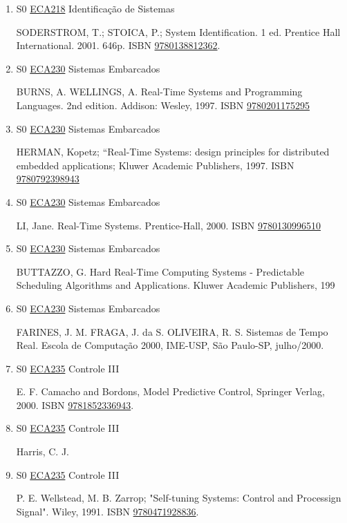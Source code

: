 \documentclass[12pt,a4paper]{book}
\begin{document}
\begin{enumerate}
 ISERMAN, R.;  MUNCHHOF, M.;  Identification of Dynamic Systems - An Introduction With Applications.  1 ed.   London: Springer.  2010.  705p.  ISBN \href{http://www.google.com/search?hl=pt-BR&tbo=p&tbm=bks&q=isbn:9783540788782&num=10}{9783540788782}.  
 
 
 \item S0 \hyperref[PUD:ECA218]{ECA218} Identificação de Sistemas

 SODERSTROM, T.;  STOICA, P.;  System Identification.  1 ed.  Prentice Hall International.  2001.  646p.  ISBN \href{http://www.isbnsearch.org/isbn/9780138812362}{9780138812362}.
 \item S0 \hyperref[PUD:ECA230]{ECA230} Sistemas Embarcados

 BURNS, A.  WELLINGS, A.  Real-Time Systems and Programming Languages.  2nd edition.  Addison: Wesley, 1997.  ISBN \href{http://www.isbnsearch.org/isbn/9780201175295}{9780201175295}
 
 
 \item S0 \hyperref[PUD:ECA230]{ECA230} Sistemas Embarcados

 HERMAN,  Kopetz;  “Real-Time  Systems: design principles for distributed embedded applications;  Kluwer Academic Publishers, 1997.  ISBN \href{http://www.isbnsearch.org/isbn/9780792398943}{9780792398943}
 
 
 \item S0 \hyperref[PUD:ECA230]{ECA230} Sistemas Embarcados

 LI, Jane.  Real-Time Systems.  Prentice-Hall, 2000.  ISBN \href{http://www.isbnsearch.org/isbn/9780130996510}{9780130996510}
 
 
 \item S0 \hyperref[PUD:ECA230]{ECA230} Sistemas Embarcados

 BUTTAZZO, G.  Hard Real-Time Computing Systems - Predictable Scheduling Algorithms and Applications.  Kluwer Academic Publishers, 199
 
 
 \item S0 \hyperref[PUD:ECA230]{ECA230} Sistemas Embarcados

 FARINES, J. M.  FRAGA, J.  da S.  OLIVEIRA, R.  S.  Sistemas de Tempo Real.  Escola de Computação 2000, IME-USP, São Paulo-SP, julho/2000.
 \item S0 \hyperref[PUD:ECA235]{ECA235} Controle III

  E. F.  Camacho and Bordons, Model Predictive Control, Springer Verlag, 2000.  ISBN \href{http://www.google.com/search?hl=pt-BR&tbo=p&tbm=bks&q=isbn:9781852336943&num=10}{9781852336943}. 

 
 
 \item S0 \hyperref[PUD:ECA235]{ECA235} Controle III

  Harris, C. J.  \
 \item S0 \hyperref[PUD:ECA235]{ECA235} Controle III

  P.  E.  Wellstead, M.  B.  Zarrop;  "Self-tuning Systems: Control and Processign Signal".  Wiley, 1991.  ISBN \href{http://www.isbnsearch.org/isbn/9780471928836}{9780471928836}.\end{enumerate}
\newpage
\end{document}
